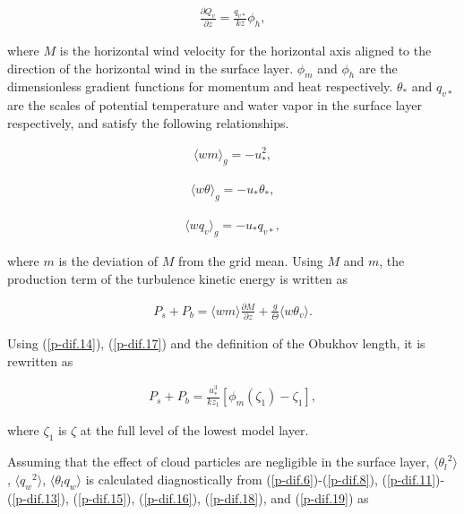 \begin{eqnarray} \frac{\partial Q_v}{\partial z} = \frac{q_{v*}}{kz}\phi_h \label{p-dif.16},\end{eqnarray}

where \(M\) is the horizontal wind velocity for the horizontal axis
aligned to the direction of the horizontal wind in the surface layer.
\(\phi_m\) and \(\phi_h\) are the dimensionless gradient functions for
momentum and heat respectively. \(\theta_*\) and \(q_{v*}\) are the
scales of potential temperature and water vapor in the surface layer
respectively, and satisfy the following relationships.

\begin{eqnarray} \langle wm \rangle_g = -u_*^2 \label{p-dif.17},\end{eqnarray}

\begin{eqnarray} \langle w\theta \rangle_g = -u_*\theta_* \label{p-dif.18},\end{eqnarray}

\begin{eqnarray} \langle wq_v \rangle_g = -u_*q_{v*} \label{p-dif.19},\end{eqnarray}

where \(m\) is the deviation of \(M\) from the grid mean. Using \(M\)
and \(m\), the production term of the turbulence kinetic energy is
written as

\begin{eqnarray} P_s + P_b = \langle wm \rangle \frac{\partial M}{\partial z} + \frac{g}{\Theta} \langle w\theta_v \rangle. \end{eqnarray}

Using (\ref{p-dif.14}), (\ref{p-dif.17}) and the definition of
the Obukhov length, it is rewritten as

\begin{eqnarray} P_s + P_b = \frac{u_*^3}{kz_1}\left[\phi_m\left(\zeta_1\right)-\zeta_1\right], \end{eqnarray}

where \(\zeta_1\) is \(\zeta\) at the full level of the lowest model
layer.

Assuming that the effect of cloud particles are negligible in the
surface layer, \(\langle {\theta_l}^2\rangle\),
\(\langle {q_w}^2\rangle\), \(\langle \theta_lq_w\rangle\) is calculated
diagnostically from (\ref{p-dif.6})-(\ref{p-dif.8}),
(\ref{p-dif.11})-(\ref{p-dif.13}), (\ref{p-dif.15}),
(\ref{p-dif.16}), (\ref{p-dif.18}), and (\ref{p-dif.19})
as

